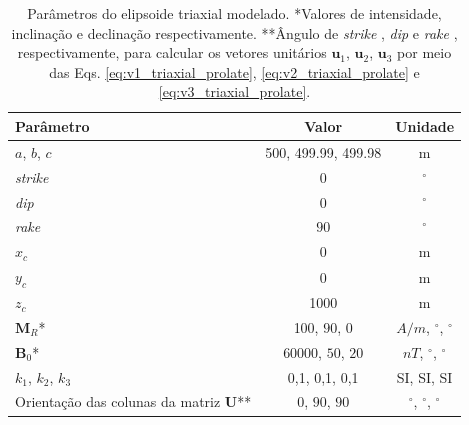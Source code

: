 \begin{table}[h!]
	\begin{center}
		\begin{tabular}{|l|c|c|}
			\hline
			\textbf{Parâmetro}  & \textbf{Valor} & \textbf{Unidade} \\
			\hline 
			$a$, $b$, $c$   & 500, 499.99, 499.98 & m\\
			\hline
			\textit{strike}   & $0$ & $^{\circ}$\\
			\hline
			\textit{dip}   & $0$ & $^{\circ}$\\
			\hline
			\textit{rake}   & $90$  & $^{\circ}$\\
			\hline
			$x_c$   & 0  & m\\
			\hline          
			$y_c$   & 0  & m\\
			\hline                
			$z_c$   & 1000 & m \\
			\hline
			$\mathbf{M}_{R}$*  & 100, $90$, $0$ & $A/m$, $^{\circ}$, $^{\circ}$ \\
			\hline
			$\mathbf{B}_{0}$*    & 60000, $50$, $20$ & $nT$, $^{\circ}$, $^{\circ}$ \\
			\hline
			$k_{1}$, $k_{2}$, $k_{3}$   & 0,1, 0,1, 0,1 & SI, SI, SI \\
			\hline
			Orientação das colunas da matriz $\mathbf{U}$**  & $0$, $90$, $90$ & $^{\circ}$, $^{\circ}$, $^{\circ}$ \\
			\hline
		\end{tabular}
		\caption{Parâmetros do elipsoide triaxial modelado. *Valores de intensidade, inclinação e declinação respectivamente. **Ângulo de \textit{strike} , \textit{dip}  e \textit{rake} , respectivamente, para calcular os vetores unitários $\mathbf{u}_{1}$, $\mathbf{u}_{2}$, $\mathbf{u}_{3}$ por meio das Eqs. \ref{eq:v1_triaxial_prolate}, \ref{eq:v2_triaxial_prolate} e \ref{eq:v3_triaxial_prolate}.}
	\end{center}
	\label{tab:triaxial_oblate1}
\end{table}

\vspace{2cm}

